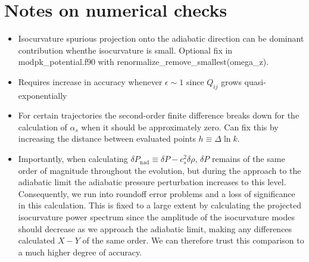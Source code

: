 \documentclass[11pt]{article}
\begin{document}
\section{Notes on numerical checks}

\begin{itemize}

  \item Isocurvature spurious projection onto the adiabatic direction can be dominant contribution whenthe isocurvature is small.  Optional fix in modpk\_potential.f90 with renormalize\_remove\_smallest(omega\_z).

  \item Requires increase in accuracy whenever $\epsilon \sim 1$ since $Q_{ij}$ grows quasi-exponentially

  \item For certain trajectories the second-order finite difference breaks down for the calculation of $\alpha_s$ when it should be approximately zero.  Can fix this by increasing the distance between evaluated points $h \equiv \Delta \ln k$.

  \item Importantly, when calculating $\delta P_\mathrm{nad} \equiv \delta P - c_s^2 \delta \rho$, $\delta P$ remains of the same order of magnitude throughout the evolution, but during the approach to the adiabatic limit the adiabatic pressure perturbation increases to this level.  Consequently, we run into roundoff error problems and a loss of significance in this calculation.  This is fixed to a large extent by calculating the projected isocurvature power spectrum since the amplitude of the isocurvature modes should decrease as we approach the adiabatic limit, making any differences calculated $X-Y$ of the same order.  We can therefore trust this comparison to a much higher degree of accuracy.

\end{itemize}






\end{document}
